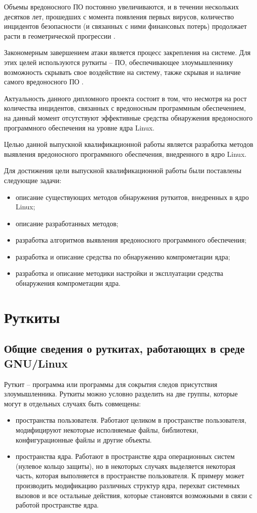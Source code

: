 \documentclass{gost7.32-2001}
\begin{document}
Объемы вредоносного ПО постоянно увеличиваются, и в течении нескольких
десятков лет, прошедших с момента появления первых вирусов, количество
инцидентов безопасности (и связанных с ними финансовых потерь)
продолжает расти в геометрической прогрессии .

Закономерным завершением атаки является процесс закрепления на
системе. Для этих целей используются руткиты – ПО, обеспечивающее
злоумышленнику возможность скрывать свое воздействие на систему, также
скрывая и наличие самого вредоносного ПО .

Актуальность данного дипломного проекта состоит в том, что несмотря на
рост количества инцидентов, связанных с вредоносным программным
обеспечением, на данный момент отсутствуют эффективные средства
обнаружения вредоносного программного обеспечения на уровне ядра
Linux.

Целью данной выпускной квалификационной работы является разработка
методов выявления вредоносного программного обеспечения, внедренного в
ядро Linux.

Для достижения цели выпускной квалификационной работы были поставлены
следующие задачи:
\begin{itemize}
\item
  описание существующих методов обнаружения руткитов, внедренных в
  ядро Linux;
\item
  описание разработанных методов;
\item
  разработка алгоритмов выявления вредоносного программного
  обеспечения;
\item
  разработка и описание средства по обнаружению компрометации ядра;
\item
  разработка и описание методики настройки и эксплуатации средства
  обнаружения компрометации ядра.
\end{itemize}

\newpage
\section{Руткиты}

\subsection{Общие сведения о руткитах, работающих в среде GNU/Linux}
Руткит – программа или программы для сокрытия следов присутствия
злоумышленника. Руткиты можно условно разделить на две группы, которые
могут в отдельных случаях быть совмещены:
\begin{itemize}
\item
  пространства пользователя. Работают целиком в пространстве
  пользователя, модифицируют некоторые исполняемые файлы,
  библиотеки, конфигурационные файлы и другие объекты.
\item
  пространства ядра. Работают в пространстве ядра операционных систем
  (нулевое кольцо защиты), но в некоторых случаях выделяется некоторая
  часть, которая выполняется в пространстве пользователя. К примеру
  может производить модификацию различных структур ядра, перехват
  системных вызовов и все остальные действия, которые становятся
  возможными в связи с работой пространстве ядра.
\end{itemize}
\end{document}

